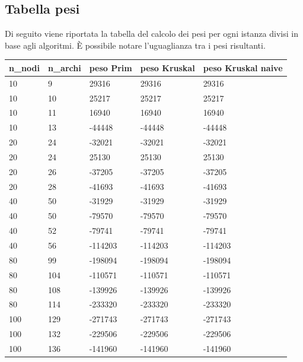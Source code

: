 \newpage

\subsection{Tabella pesi}
\label{tabella\_pesi}

Di seguito viene riportata la tabella del calcolo dei pesi per ogni istanza divisi in base agli algoritmi. È possibile notare l'uguaglianza tra i pesi risultanti.

\renewcommand{\arraystretch}{2}
\begin{longtable}[H]{|p{1.5cm}|p{1.5cm}|p{2cm}|p{3cm}|p{4cm}|} \hline
    \rowcolor{lightgray}
    \textbf{n\_nodi} & \textbf{n\_archi} & \textbf{peso Prim} & \textbf{peso Kruskal} & \textbf{peso Kruskal naive} \\ \hline\hline
    \endhead
    10 & 9 & 29316 & 29316 & 29316 \\ \hline
    10 & 10 & 25217 & 25217 & 25217 \\ \hline
    10 & 11 & 16940 & 16940 & 16940 \\ \hline
    10 & 13 & -44448 & -44448 & -44448 \\ \hline
    20 & 24 & -32021 & -32021 & -32021 \\ \hline 
    20 & 24 & 25130 & 25130 & 25130 \\ \hline
    20 & 26 & -37205 & -37205 & -37205 \\ \hline
    20 & 28 & -41693 & -41693 & -41693 \\ \hline
    40 & 50 & -31929 & -31929 & -31929 \\ \hline
    40 & 50 & -79570 & -79570 & -79570 \\ \hline
    40 & 52 & -79741 & -79741 & -79741 \\ \hline
    40 & 56 & -114203 & -114203 & -114203 \\ \hline
    80 & 99 & -198094 & -198094 & -198094 \\ \hline
    80 & 104 & -110571 & -110571 & -110571 \\ \hline
    80 & 108 & -139926 & -139926 & -139926 \\ \hline
    80 & 114 & -233320 & -233320 & -233320 \\ \hline
    100 & 129 & -271743 & -271743 & -271743 \\ \hline
    100 & 132 & -229506 & -229506 & -229506 \\ \hline
    100 & 136 & -141960 & -141960 & -141960 \\ \hline

\end{longtable}
